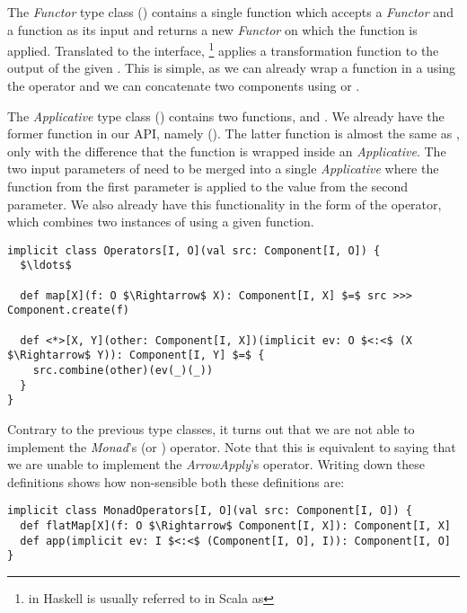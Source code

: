 The \textit{Functor} type class () contains a single function  which accepts a \textit{Functor} and a function as its input and returns a new \textit{Functor} on which the function is applied. Translated to the \comp interface, \footnote{ in Haskell is usually referred to in Scala as } applies a transformation function to the output of the given \comp. This is simple, as we can already wrap a function in a \comp using the  operator and we can concatenate two components using  or \code{(>>>)}.

The \textit{Applicative} type class () contains two functions,  and \code{(<*>)}. We already have the former function in our API, namely  (). The latter function is almost the same as , only with the difference that the function is wrapped inside an \textit{Applicative}. The two input parameters of \code{(<*>)} need to be merged into a single \textit{Applicative} where the function from the first parameter is applied to the value from the second parameter. We also already have this functionality in the form of the  operator, which combines two instances of \comp using a given function.

\begin{lstlisting}[style=ScalaStyle, caption={\textit{Functor} and \textit{Applicative} operators}, label={lst:functor-and-applicative}]
implicit class Operators[I, O](val src: Component[I, O]) {
  $\ldots$

  def map[X](f: O $\Rightarrow$ X): Component[I, X] $=$ src >>> Component.create(f)
  
  def <*>[X, Y](other: Component[I, X])(implicit ev: O $<:<$ (X $\Rightarrow$ Y)): Component[I, Y] $=$ {
    src.combine(other)(ev(_)(_))
  }
}
\end{lstlisting}

Contrary to the previous type classes, it turns out that we are not able to implement the \textit{Monad}'s \code{(>>=)} (or ) operator. Note that this is equivalent to saying that we are unable to implement the \textit{ArrowApply}'s  operator. Writing down these definitions shows how non-sensible both these definitions are:

\begin{lstlisting}[style=InlineScalaStyle]
implicit class MonadOperators[I, O](val src: Component[I, O]) {
  def flatMap[X](f: O $\Rightarrow$ Component[I, X]): Component[I, X]
  def app(implicit ev: I $<:<$ (Component[I, O], I)): Component[I, O]
}
\end{lstlisting}

